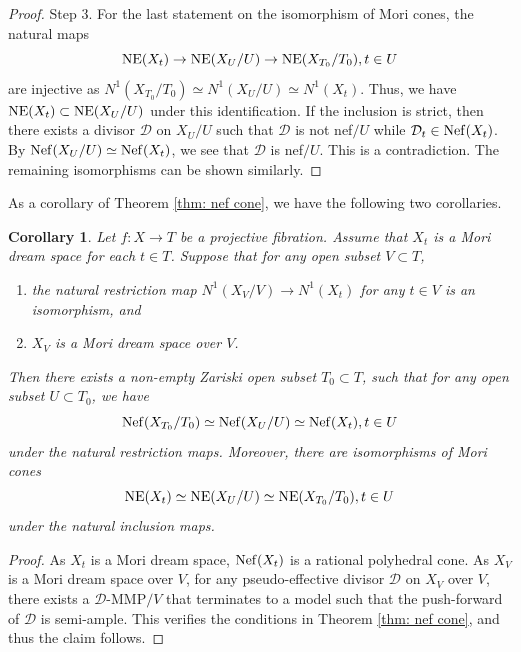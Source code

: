 \documentclass[11pt,oneside,reqno]{amsart}
\numberwithin{equation}{section}
\newtheorem{corollary}[proposition]{Corollary}
\theoremstyle{definition}
\newcommand{\Nef}{{\rm {Nef}}}
\newcommand{\NE}{{\rm {NE}}}
\newcommand{\mD}{\mathcal{D}}
\begin{document}
\begin{proof}
Step 3. For the last statement on the isomorphism of Mori cones, the natural maps
\[
\NE(X_t) \to \NE(X_U/U) \to \NE(X_{T_0}/T_0), t\in U
\] are injective as $N^1(X_{T_0}/T_0) \simeq N^1(X_U/U) \simeq N^1(X_t)$. Thus, we have $\NE(X_t) \subset \NE(X_U/U)$ under this identification. If the inclusion is strict, then there exists a divisor $\mD$ on $X_U/U$ such that $\mD$ is not nef$/U$ while $\mD_t \in \Nef(X_t)$. By $\Nef(X_U/U) \simeq \Nef(X_t)$, we see that $\mD$ is nef$/U$. This is a contradiction. The remaining isomorphisms can be shown similarly.
\end{proof}



As a corollary of Theorem \ref{thm: nef cone}, we have the following two corollaries.


\begin{corollary}\label{cor: nef cone for MDS}
Let $f: X \to T$ be a projective fibration. Assume that $X_t$ is a Mori dream space for each $t\in T$. Suppose that for any open subset $V\subset T$, 
\begin{enumerate}
\item the natural restriction map $N^1(X_V/V) \to N^1(X_t)$ for any $t\in V$ is an isomorphism, and
\item $X_V$ is a Mori dream space over $V$.
\end{enumerate}
Then there exists a non-empty Zariski open subset $T_0\subset T$, such that for any open subset $U\subset T_0$, we have
\[
\Nef(X_{T_0}/T_0) \simeq \Nef(X_U/U) \simeq \Nef(X_t), t\in U
\] under the natural restriction maps. Moreover, there are isomorphisms of Mori cones
\[
\NE(X_t) \simeq \NE(X_U/U) \simeq \NE(X_{T_0}/T_0), t\in U
\] under the natural inclusion maps.
\end{corollary}
\begin{proof}
As $X_t$ is a Mori dream space, $\Nef(X_t)$ is a rational polyhedral cone. As $X_V$ is a Mori dream space over $V$, for any pseudo-effective divisor $\mD$ on $X_V$ over $V$, there exists a $\mD$-MMP$/V$ that terminates to a model such that the push-forward of $\mD$ is semi-ample. This verifies the conditions in Theorem \ref{thm: nef cone}, and thus the claim follows.
\end{proof}
\end{document}
